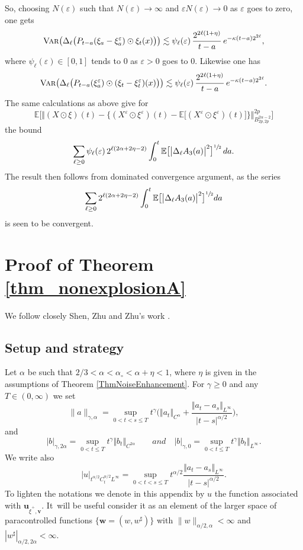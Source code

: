 \documentclass[10pt]{amsart}
\theoremstyle{definition}
\let\epsilon\varepsilon
\let\eps\epsilon
\newcommand\bbE{\mathbb{E}}
\newcommand{\bsu}{\boldsymbol{u}}
\newcommand{\bsv}{\boldsymbol{v}}
\newcommand{\bsw}{\boldsymbol{w}}
\newcommand{\norme}[1]{\Vert #1 \Vert}
\begin{document}
\par\smallskip\noindent
So, choosing $N(\eps)$ such that $N(\eps)\to \infty$ and $\eps N(\eps)\to 0$ as $\eps$ goes to zero, one gets
\[
\textsc{{Var}}\bigl( \Delta_\ell\bigl( P_{t-a}(\xi_a-\xi_a^{\eps})\odot \xi_t (x) \bigr) \bigr) \lesssim \psi_\ell(\eps) \, \frac{2^{2\ell(1+\eta)}}{t-a} \, e^{-\kappa(t-a)2^{2\ell}},
\]
where $\psi_\ell(\eps)\in[0,1]$ tends to $0$ as $\epsilon>0$ goes to $0$. Likewise one has
\[
\textsc{{Var}}\bigl( \Delta_\ell\bigl( P_{t-a}(\xi_a^\eps)\odot (\xi_t-\xi_t^\eps) (x) \bigr) \bigr) \lesssim \psi_\ell(\eps) \, \frac{2^{2\ell(1+\eta)}}{t-a} \, e^{-\kappa(t-a)2^{2\ell}}.
\]
The same calculations as above give for
\[
\bbE\bigl[\big\Vert (X\odot\xi)(t) - \bigl\{ (X^\eps\odot\xi^\eps)(t)-\bbE\bigl[(X^\eps\odot\xi^\eps)(t) \bigr]\bigr\}\big\Vert_{B^{2\alpha-2}_{2p,2p}}^{2p}\bigr]
\]
the bound
\[
\sum_{\ell\geq 0} \psi_\ell(\eps) \, 2^{\ell(2\alpha+2\eta-2)} \int_0^t \bbE\bigl[\big| \Delta_\ell A_3(a)\big|^2 \bigr]^{\sfrac{1}{2}} \, da.
\]
The result then follows from dominated convergence argument, as the series
\[
\sum_{\ell\geq 0} 2^{\ell(2\alpha+2\eta-2)} \int_0^t \bbE\bigl[\big| \Delta_\ell A_3(a)\big|^2 \bigr]^{\sfrac{1}{2}} da
\]
is seen to be convergent.

\section{Proof of Theorem \ref{thm_nonexplosionA}}
\label{section_appendix_nonexplosion}

We follow closely Shen, Zhu and Zhu's work \cite{ShenZhuZhu}.

\subsection{Setup and strategy}

Let $\alpha$ be such that $2 / 3 <
\alpha < \alpha_{\circ} <\alpha+\eta< 1$, where $\eta$ is given in the assumptions of Theorem \ref{ThmNoiseEnhancement}. For $\gamma \geq 0$ and any $T\in(0,\infty)$ we
set
\[
\| a \|_{\gamma, \alpha} = \sup_{0 < t < s \leq T} t^{\gamma} \bigl( \norme{ a_t
}_{C^\alpha} + \frac{\norme{ a_t - a_s }_{L^{\infty}}}{| t - s |^{\alpha / 2}}
\bigr),
\]
and
\[
| b |_{\gamma, 2 \alpha} = \sup_{0 < t \leq T} t^{\gamma} \norme{ b_t }_{C^{2
\alpha}}
\qquad \textit{and} \quad
|b|_{\gamma, 0} = \sup_{0 < t \leq T} t^{\gamma} \norme{ b_t }_{L^{\infty}}.
\]
We write also
\[
| u |_{t^{\alpha / 2} C^{\alpha / 2}_t L^{\infty}} = \sup_{0 < t < s \leq T} t^{\alpha/2} \frac{\norme{ a_t - a_s }_{L^{\infty}}}{| t - s |^{\alpha / 2}}.
\]
To lighten the notations we denote in this appendix by $u$ the function associated with $\bsu_{\widehat\xi^+,\bsv}$. It~will be useful consider it as an element of the larger space of paracontrolled functions $\{\bsw = (w, w^{\sharp}) \}$ with $\| w \|_{\alpha / 2, \alpha} < \infty$ and $| w^{\sharp} |_{\alpha / 2, 2 \alpha} <
\infty$.
\end{document}
